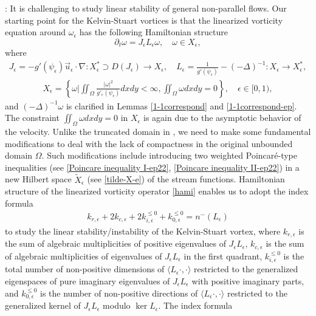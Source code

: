 \documentclass[1 [leqno, 11pt]{amsart}
\numberwithin{equation}{section}
\let\ep=\epsilon
\begin{document}
\begin{CJK*}{GBK}{song}
: It is challenging to study linear stability of general non-parallel flows.
Our starting point for the Kelvin-Stuart vortices is that  the linearized vorticity equation around $\omega_\ep$ has
 the following  Hamiltonian structure
 \begin{equation}\label{hami}
 \partial_t \omega = J_\epsilon L_\epsilon\omega, \quad \omega \in X_\ep,
 \end{equation}
 where
 \begin{align}\label{J-ep-J-ep-def}J_\epsilon = -g'(\psi_\epsilon)\vec{u}_\epsilon\cdot\nabla: X_\ep^* \supset D(J_\epsilon) \rightarrow X_\ep, \quad
 L_\epsilon = \frac {1} {g'(\psi_\epsilon)} - (-\Delta)^{-1}: X_\ep \rightarrow X_\ep^*,\end{align}
\begin{align}\label{spaceXep}
X_\ep = \left\{\omega\bigg| \iint_\Omega \frac{|\omega|^2}{g'_\epsilon(\psi_\epsilon)} dxdy < \infty, \iint_\Omega \omega dxdy = 0 \right\},\quad \epsilon\in[0,1),
\end{align}
and $(-\Delta)^{-1}\omega$ is clarified in Lemmas \ref{1-1correspond} and \ref{1-1correspond-ep}.
The constraint $\iint_\Omega\omega dxdy=0$ in $X_\ep$ is   again due to the asymptotic behavior of the velocity.
Unlike  the truncated  domain in \cite{holm1986nonlinear},  we need to  make some fundamental  modifications to  deal with  the lack of compactness in the original unbounded domain $\Omega$. Such modifications include introducing  two weighted  Poincar\'e-type inequalities (see \eqref{Poincare inequality I-ep22},  \eqref{Poincare inequality II-ep22}) in a new Hilbert space $\tilde X_\ep$ (see \eqref{tilde-X-e}) of the stream functions.
Hamiltonian structure of the linearized vorticity operator \eqref{hami} enables us to adopt  the index  formula
 \begin{align}\label{index-formula-stuart}
k_{r,\ep} + 2k_{c,\ep}+2k_{i,\ep}^{\leq0}+k_{0,\ep}^{\leq0} = n^-(L_\ep)
\end{align}
 to study the linear stability/instability of the Kelvin-Stuart vortex,
where $k_{r,\ep}$ is the sum of algebraic multiplicities of positive eigenvalues of $J_\ep L_\ep$, $k_{c,\ep}$ is the sum of algebraic multiplicities of eigenvalues of $J_\ep L_\ep$ in the first quadrant, $k_{i,\ep}^{\leq 0}$ is the total number of non-positive dimensions of $\langle L_\ep\cdot, \cdot \rangle$ restricted to the generalized eigenspaces of pure imaginary eigenvalues of $J_\ep L_\ep$ with positive imaginary parts, and $k_{0,\ep}^{\leq 0}$ is the number of non-positive directions of $\langle L_\ep\cdot, \cdot \rangle$ restricted to the generalized kernel of $J_\ep L_\ep$ modulo $\ker L_\ep$. The index formula

\end{CJK*}
\end{document}
